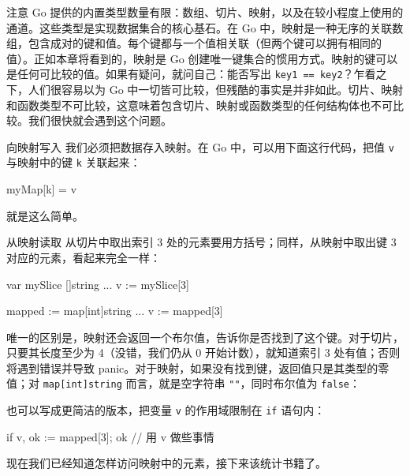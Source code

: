 \begin{infobox}{注意}
Go 提供的内置类型数量有限：数组、切片、映射，以及在较小程度上使用的通道。这些类型是实现数据集合的核心基石。在 Go 中，映射是一种无序的关联数组，包含成对的键和值。每个键都与一个值相关联（但两个键可以拥有相同的值）。正如本章将看到的，映射是 Go 创建唯一键集合的惯用方式。映射的键可以是任何可比较的值。如果有疑问，就问自己：能否写出 \texttt{key1 == key2}？乍看之下，人们很容易以为 Go 中一切皆可比较，但残酷的事实是并非如此。切片、映射和函数类型不可比较，这意味着包含切片、映射或函数类型的任何结构体也不可比较。我们很快就会遇到这个问题。
\end{infobox}

\begin{infobox}{向映射写入}
我们必须把数据存入映射。在 Go 中，可以用下面这行代码，把值 \texttt{v} 与映射中的键 \texttt{k} 关联起来：

\begin{gocode}[]
myMap[k] = v
\end{gocode}

就是这么简单。
\end{infobox}

\begin{infobox}{从映射读取}
从切片中取出索引 3 处的元素要用方括号；同样，从映射中取出键 3 对应的元素，看起来完全一样：

\begin{gocode}[]
var mySlice []string
...
v := mySlice[3]

mapped := map[int]string{}
...
v := mapped[3]
\end{gocode}

唯一的区别是，映射还会返回一个布尔值，告诉你是否找到了这个键。对于切片，只要其长度至少为 4（没错，我们仍从 0 开始计数），就知道索引 3 处有值；否则将遇到错误并导致 panic。对于映射，如果没有找到键，返回值只是其类型的零值；对 \texttt{map[int]string} 而言，就是空字符串 \texttt{""}，同时布尔值为 \texttt{false}：

\begin{gocode}[]
v, ok := mapped[3]
if ok {...
\end{gocode}

也可以写成更简洁的版本，把变量 \texttt{v} 的作用域限制在 \texttt{if} 语句内：

\begin{gocode}[]
if v, ok := mapped[3]; ok {
    // 用 v 做些事情
}
\end{gocode}

现在我们已经知道怎样访问映射中的元素，接下来该统计书籍了。
\end{infobox}

